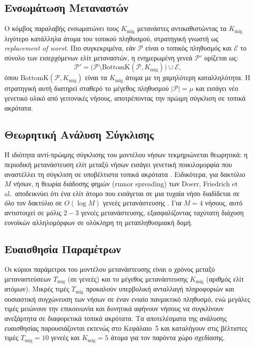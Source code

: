 \subsection*{Ενσωμάτωση Μεταναστών}

Ο κόμβος παραλαβής ενσωματώνει τους $K_{\text{mig}}$ μετανάστες αντικαθιστώντας τα $K_{\text{mig}}$ λιγότερο κατάλληλα άτομα του τοπικού πληθυσμού, στρατηγική γνωστή ως \emph{replacement of worst}. Πιο συγκεκριμένα, εάν $\mathcal{P}$ είναι ο τοπικός πληθυσμός και $\mathcal{E}$ το σύνολο των εισερχόμενων ελίτ μεταναστών, η ενημερωμένη γενεά $\mathcal{P}'$ ορίζεται ως:
\begin{equation}
\label{eq:migration_replace}
\mathcal{P}' = \bigl(\mathcal{P} \setminus \text{BottomK}(\mathcal{P}, K_{\text{mig}})\bigr) \cup \mathcal{E},
\end{equation}
όπου $\text{BottomK}(\mathcal{P}, K_{\text{mig}})$ είναι τα $K_{\text{mig}}$ άτομα με τη χαμηλότερη καταλληλότητα. Η στρατηγική αυτή διατηρεί σταθερό το μέγεθος πληθυσμού $|\mathcal{P}| = \mu$ και εισάγει νέο γενετικό υλικό από γειτονικές νήσους, αποτρέποντας την πρώιμη σύγκλιση σε τοπικά ακρότατα.

\subsection*{Θεωρητική Ανάλυση Σύγκλισης}
 
Η ιδιότητα αντί-πρώιμης σύγκλισης του μοντέλου νήσων τεκμηριώνεται θεωρητικά: η περιοδική μετανάστευση ελίτ μεταξύ νήσων εισάγει γενετική ποικιλομορφία που αναστέλλει τη σύγκλιση σε υποβέλτιστα τοπικά ακρότατα \cite{cantupaz2000parallel}. Ειδικότερα, για δακτύλιο $M$ νήσων, η θεωρία διάδοσης φημών (rumor spreading) των Doerr, Friedrich et al.\ αποδεικνύει ότι ένα ελίτ άτομο που εισάγεται σε μια τυχαία νήσο διαδίδεται σε \emph{όλο} τον δακτύλιο σε $O(\log M)$ γενεές μετανάστευσης \cite{friedrich2017island}. Για $M = 4$ νήσους, αυτό αντιστοιχεί σε μόλις $2{-}3$ γενεές μετανάστευσης, εξασφαλίζοντας ταχύτατη διάχυση ευνοϊκών αλληλομόρφων σε ολόκληρη τη μεταπληθυσμιακή δομή.

\subsection*{Ευαισθησία Παραμέτρων}

Οι κύριοι παράμετροι του μοντέλου μετανάστευσης είναι ο χρόνος μεταξύ μεταναστεύσεων $T_{\text{mig}}$ (σε γενεές) και το μέγεθος μετανάστευσης $K_{\text{mig}}$ (αριθμός ελίτ ατόμων). Μικρές τιμές $T_{\text{mig}}$ προκαλούν υπερβολική ανταλλαγή πληροφοριών και ουσιαστική συγχώνευση των νήσων σε έναν ενιαίο πανμικτικό πληθυσμό, ενώ μεγάλες τιμές μειώνουν την επικοινωνία και δυνητικά αφήνουν νήσους να συγκλίνουν ανεξάρτητα σε διαφορετικά τοπικά ακρότατα. Τα αποτελέσματα της ανάλυσης ευαισθησίας παρουσιάζονται εκτενώς στο Κεφάλαιο~5 και καταλήγουν στις βέλτιστες τιμές $T_{\text{mig}} = 10$ γενεές και $K_{\text{mig}} = 5$ άτομα για τον παρόντα χώρο σχεδίασης.
